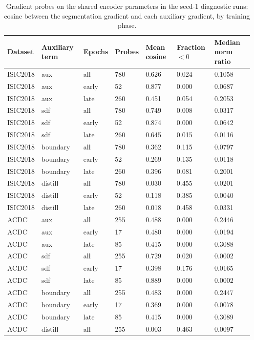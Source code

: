 \begin{longtable}{lllllll}
\caption{\label{tab:gradient}Gradient probes on the shared encoder parameters in the seed-1 diagnostic runs: cosine between the segmentation gradient and each auxiliary gradient, by training phase.}\\
\toprule
Dataset & Auxiliary term & Epochs & Probes & Mean cosine & Fraction $<0$ & Median norm ratio \\
\midrule
ISIC2018 & aux & all & 780 & 0.626 & 0.024 & 0.1058 \\
ISIC2018 & aux & early & 52 & 0.877 & 0.000 & 0.0687 \\
ISIC2018 & aux & late & 260 & 0.451 & 0.054 & 0.2053 \\
ISIC2018 & sdf & all & 780 & 0.749 & 0.008 & 0.0317 \\
ISIC2018 & sdf & early & 52 & 0.874 & 0.000 & 0.0642 \\
ISIC2018 & sdf & late & 260 & 0.645 & 0.015 & 0.0116 \\
ISIC2018 & boundary & all & 780 & 0.362 & 0.115 & 0.0797 \\
ISIC2018 & boundary & early & 52 & 0.269 & 0.135 & 0.0118 \\
ISIC2018 & boundary & late & 260 & 0.396 & 0.081 & 0.2001 \\
ISIC2018 & distill & all & 780 & 0.030 & 0.455 & 0.0201 \\
ISIC2018 & distill & early & 52 & 0.118 & 0.385 & 0.0040 \\
ISIC2018 & distill & late & 260 & 0.018 & 0.458 & 0.0331 \\
ACDC & aux & all & 255 & 0.488 & 0.000 & 0.2446 \\
ACDC & aux & early & 17 & 0.480 & 0.000 & 0.0194 \\
ACDC & aux & late & 85 & 0.415 & 0.000 & 0.3088 \\
ACDC & sdf & all & 255 & 0.729 & 0.020 & 0.0002 \\
ACDC & sdf & early & 17 & 0.398 & 0.176 & 0.0165 \\
ACDC & sdf & late & 85 & 0.889 & 0.000 & 0.0002 \\
ACDC & boundary & all & 255 & 0.483 & 0.000 & 0.2447 \\
ACDC & boundary & early & 17 & 0.369 & 0.000 & 0.0078 \\
ACDC & boundary & late & 85 & 0.415 & 0.000 & 0.3089 \\
ACDC & distill & all & 255 & 0.003 & 0.463 & 0.0097 \\

\end{longtable}
